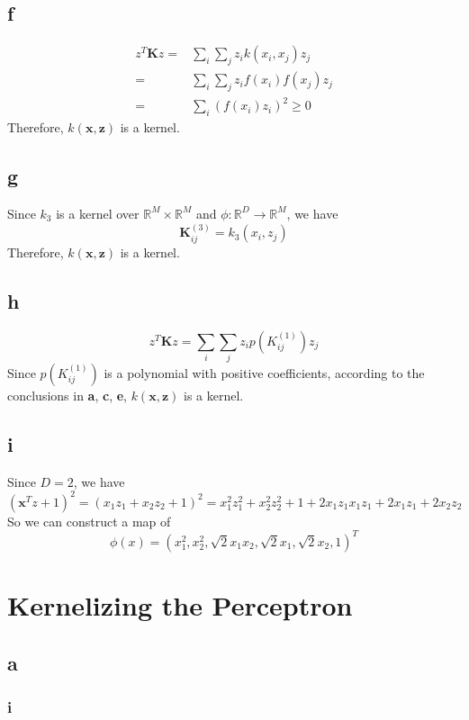 \documentclass{article}
\begin{document}
\subsection*{f}

$$
\begin{aligned}
z^T \mathbf{K} z = & \sum_{i} \sum_{j} z_i k(x_i, x_j) z_j \\
= & \sum_{i} \sum_{j} z_i f(x_i) f(x_j) z_j \\
= & \sum_{i} (f(x_i)z_i)^2 \geq 0
\end{aligned}
$$
Therefore, $k(\mathbf{x}, \mathbf{z})$ is a kernel.

\subsection*{g}

Since $k_{3}$  is a kernel over $\mathbb{R}^{M} \times \mathbb{R}^{M}$ and $\phi: \mathbb{R}^{D} \rightarrow \mathbb{R}^{M}$, we have
$$\mathbf{K}^{(3)}_{ij} = k_3(x_i, z_j)$$
Therefore, $k(\mathbf{x}, \mathbf{z})$ is a kernel.

\subsection*{h}

$$z^T \mathbf{K} z = \sum_{i} \sum_{j} z_i p(K^{(1)}_{ij}) z_j$$
Since $p(K^{(1)}_{ij})$ is a polynomial with positive coefficients, according to the conclusions in \textbf{a}, \textbf{c}, \textbf{e}, $k(\mathbf{x}, \mathbf{z})$ is a kernel.

\subsection*{i}

Since $D = 2$, we have
$$(\mathbf{x}^T z + 1)^2 = (x_1z_1 + x_2z_2 + 1)^2 = x_1^2z_1^2 + x_2^2z_2^2 + 1 + 2x_1z_1x_1z_1 + 2x_1z_1 + 2x_2z_2$$
So we can construct a map of
$$\phi(x) = (x_1^2, x_2^2, \sqrt{2}x_1x_2, \sqrt{2}x_1, \sqrt{2}x_2 ,1)^T$$

\section{Kernelizing the Perceptron}

\subsection*{a}

\subsubsection*{i}
\end{document}
